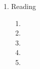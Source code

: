 \begin{enumerate}[label=Week \arabic*]
\begin{enumerate}[label=Day \arabic*]
		\item 
		\item 
		\item 
		\item 
		\item 
	\end{enumerate}
	\item Reading
	\begin{enumerate}[label=Day \arabic*]
		\item 
		\item 
		\item 
		\item 
		\item 
	\end{enumerate}
\end{enumerate}
